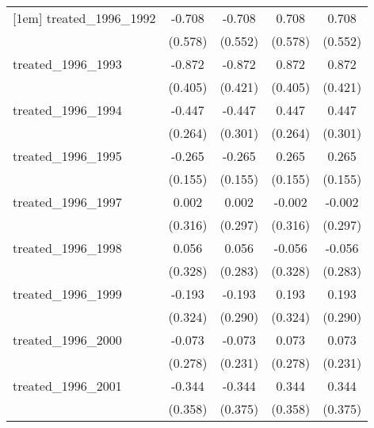 {\begin{tabular}{l*{4}{c}}
[1em]
treated\_1996\_1992&      -0.708         &      -0.708         &       0.708         &       0.708         \\
            &     (0.578)         &     (0.552)         &     (0.578)         &     (0.552)         \\
[1em]
treated\_1996\_1993&      -0.872\sym{*}  &      -0.872\sym{*}  &       0.872\sym{*}  &       0.872\sym{*}  \\
            &     (0.405)         &     (0.421)         &     (0.405)         &     (0.421)         \\
[1em]
treated\_1996\_1994&      -0.447         &      -0.447         &       0.447         &       0.447         \\
            &     (0.264)         &     (0.301)         &     (0.264)         &     (0.301)         \\
[1em]
treated\_1996\_1995&      -0.265         &      -0.265         &       0.265         &       0.265         \\
            &     (0.155)         &     (0.155)         &     (0.155)         &     (0.155)         \\
[1em]
treated\_1996\_1997&       0.002         &       0.002         &      -0.002         &      -0.002         \\
            &     (0.316)         &     (0.297)         &     (0.316)         &     (0.297)         \\
[1em]
treated\_1996\_1998&       0.056         &       0.056         &      -0.056         &      -0.056         \\
            &     (0.328)         &     (0.283)         &     (0.328)         &     (0.283)         \\
[1em]
treated\_1996\_1999&      -0.193         &      -0.193         &       0.193         &       0.193         \\
            &     (0.324)         &     (0.290)         &     (0.324)         &     (0.290)         \\
[1em]
treated\_1996\_2000&      -0.073         &      -0.073         &       0.073         &       0.073         \\
            &     (0.278)         &     (0.231)         &     (0.278)         &     (0.231)         \\
[1em]
treated\_1996\_2001&      -0.344         &      -0.344         &       0.344         &       0.344         \\
            &     (0.358)         &     (0.375)         &     (0.358)         &     (0.375)         \\

\end{tabular}}
